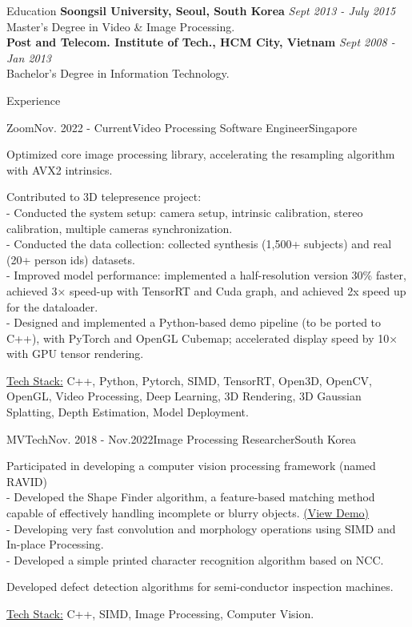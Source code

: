 \documentclass{resume}
\begin{document}
	\begin{rSection}{Education}
		{\bf Soongsil University, Seoul, South Korea} \hfill {\em Sept 2013 - July 2015} \\  {Master's Degree in Video \& Image Processing.} \smallskip \\
		{\bf Post and Telecom. Institute of Tech., HCM City, Vietnam} \hfill {\em Sept 2008 - Jan 2013} \\  {Bachelor's Degree in Information Technology.}
	\end{rSection}

	\begin{rSection}{Experience}
		\begin{rSubsection}{Zoom}{Nov. 2022 - Current}{Video Processing Software  Engineer}{Singapore}
			\item Optimized core image processing library, accelerating the resampling algorithm with AVX2 intrinsics.
			\item Contributed to 3D telepresence project:\\
			- Conducted the system setup: camera setup,  intrinsic calibration, stereo calibration, multiple cameras synchronization.\\
			- Conducted the data collection: collected synthesis (1,500+ subjects) and real (20+ person ids) datasets.\\
			- Improved model performance: implemented a half-resolution version 30\% faster, achieved 3× speed-up with TensorRT and Cuda graph, and achieved 2x speed up for the dataloader.\\
			- Designed and implemented a Python-based demo pipeline (to be ported to C++), with PyTorch and OpenGL Cubemap; accelerated display speed by 10× with GPU tensor rendering.
			\item \underline{Tech Stack:} C++, Python, Pytorch, SIMD, TensorRT, Open3D, OpenCV, OpenGL, Video Processing, Deep Learning, 3D Rendering, 3D Gaussian Splatting,  Depth Estimation,  Model Deployment.

		\end{rSubsection}

		\begin{rSubsection}{MVTech}{Nov. 2018 - Nov.2022}{Image Processing Researcher}{South Korea}
			\item Participated in developing a computer vision processing framework (named RAVID) \\
			- Developed the Shape Finder algorithm, a feature-based matching method capable of effectively handling incomplete or blurry objects. \href{https://blog.naver.com/mvtech_ravid/222119961697}{(View Demo)}\\ 			
- Developing very fast convolution and morphology operations using SIMD and In-place Processing. \\
			- Developed a simple printed character recognition algorithm based on NCC.	
			\item Developed defect detection algorithms for semi-conductor inspection machines.
			\item \underline{Tech Stack:} C++, SIMD, Image Processing, Computer Vision.


\end{rSubsection}
\end{rSection}
\end{document}
